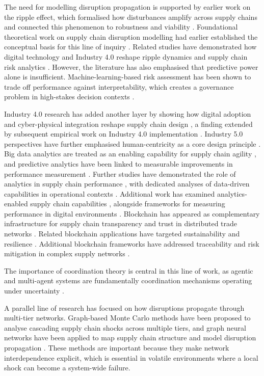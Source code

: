 The need for modelling disruption propagation is supported by earlier work on the ripple effect, which formalised how disturbances amplify across supply chains and connected this phenomenon to robustness and viability \cite{IvanovDolguiSokolov2019}. Foundational theoretical work on supply chain disruption modelling had earlier established the conceptual basis for this line of inquiry \cite{Ivanov2017}. Related studies have demonstrated how digital technology and Industry 4.0 reshape ripple dynamics and supply chain risk analytics \cite{Ivanov2019}. However, the literature has also emphasised that predictive power alone is insufficient. Machine-learning-based risk assessment has been shown to trade off performance against interpretability, which creates a governance problem in high-stakes decision contexts \cite{Baryannis2019}.

Industry 4.0 research has added another layer by showing how digital adoption and cyber-physical integration reshape supply chain design \cite{Kamble2018}, a finding extended by subsequent empirical work on Industry 4.0 implementation \cite{Xu2021}. Industry 5.0 perspectives have further emphasised human-centricity as a core design principle \cite{Ivanov2023}. Big data analytics are treated as an enabling capability for supply chain agility \cite{Waller2013}, and predictive analytics have been linked to measurable improvements in performance measurement \cite{Wang2016}. Further studies have demonstrated the role of analytics in supply chain performance \cite{Kache2018}, with dedicated analyses of data-driven capabilities in operational contexts \cite{Dubey2021}. Additional work has examined analytics-enabled supply chain capabilities \cite{FossoWamba2020}, alongside frameworks for measuring performance in digital environments \cite{Frederico2020}. Blockchain has appeared as complementary infrastructure for supply chain transparency \cite{Min2019} and trust in distributed trade networks \cite{Kouhizadeh2021}. Related blockchain applications have targeted sustainability \cite{Dubey2020} and resilience \cite{Queiroz2021}. Additional blockchain frameworks have addressed traceability \cite{Leng2021} and risk mitigation in complex supply networks \cite{Saberi2019}.

The importance of coordination theory is central in this line of work, as agentic and multi-agent systems are fundamentally coordination mechanisms operating under uncertainty \cite{MaloneCrowston1994}.

A parallel line of research has focused on how disruptions propagate through multi-tier networks. Graph-based Monte Carlo methods have been proposed to analyse cascading supply chain shocks across multiple tiers, and graph neural networks have been applied to map supply chain structure and model disruption propagation \cite{KumarDesai2025}. These methods are important because they make network interdependence explicit, which is essential in volatile environments where a local shock can become a system-wide failure.

